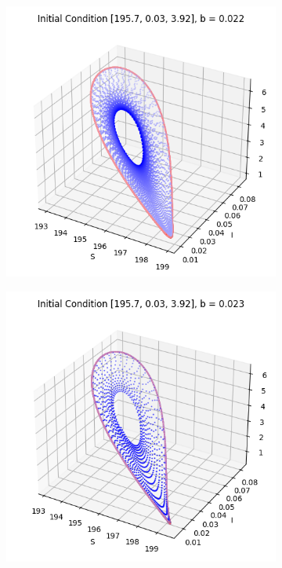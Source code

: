 \begin{itemize}
\begin{figure}[H]
\begin{subfigure}[b]{0.3\textwidth}
    \label{fig:subfig_b12}
\end{subfigure}
\begin{subfigure}[b]{0.3\textwidth}
    \centering
    \includegraphics[width=\textwidth]{images/task5/ex4_t5_2_b_13.png}
    \label{fig:subfig_b13}
\end{subfigure}
\begin{subfigure}[b]{0.3\textwidth}
    \centering
    \includegraphics[width=\textwidth]{images/task5/ex4_t5_2_b_14.png}
    \label{fig:subfig_b14}
\end{subfigure}


\end{figure}
\end{itemize}

